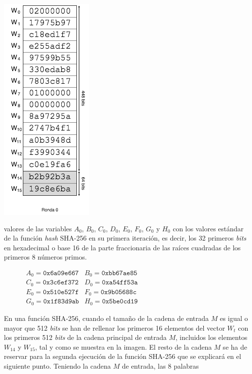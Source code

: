 \documentclass{article}
\begin{document}
        \noindent\begin{minipage}{0.23\textwidth}
        \includegraphics[scale=0.59]{img/Bitcoin_block_SHA_256_W0_W15_ronda_0}
        \end{minipage}
        \hfill
        \begin{minipage}{0.67\textwidth}
         valores de las variables $A_{0}$, $B_{0}$, $C_{0}$, $D_{0}$, $E_{0}$, $F_{0}$, $G_{0}$ y $H_{0}$ con los valores estándar de la función \textit{hash} SHA-256 en su primera iteración, es decir, los 32 primeros \textit{bits} en hexadecimal o base 16 de la parte fraccionaria de las raíces cuadradas de los primeros 8 números primos.
        
        \begin{figure}[H]
        \centering
            $\begin{array}{rr}
                A_{0} = \texttt{0x6a09e667} & B_{0} = \texttt{0xbb67ae85} \\
                C_{0} = \texttt{0x3c6ef372} & D_{0} = \texttt{0xa54ff53a} \\
                E_{0} = \texttt{0x510e527f} & F_{0} = \texttt{0x9b05688c} \\
                G_{0} = \texttt{0x1f83d9ab} & H_{0} = \texttt{0x5be0cd19}
            \end{array}$
        \end{figure}
        
        En una función SHA-256, cuando el tamaño de la cadena de entrada $M$ es igual o mayor que 512 \textit{bits} se han de rellenar los primeros 16 elementos del vector $W_t$ con los primeros 512 \textit{bits} de la cadena principal de entrada $M$, incluidos los elementos $W_{14}$ y $W_{15}$, tal y como se muestra en la imagen. El resto de la cadena $M$ se ha de reservar para la segunda ejecución de la función SHA-256 que se explicará en el siguiente punto. Teniendo la cadena $M$ de entrada, las 8 palabras
        \end{minipage}
        
\end{document}
